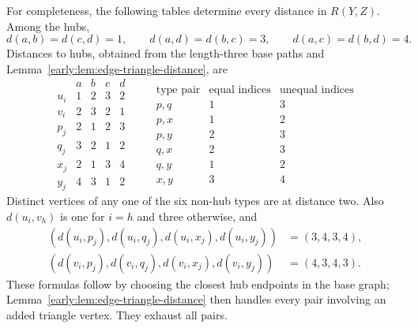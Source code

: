\documentclass[11pt,a4paper]{article}
\theoremstyle{definition}\newtheorem{definition}[theorem]{Definition}
\theoremstyle{remark}\newtheorem{remark}[theorem]{Remark}
\begin{document}
For completeness, the following tables determine every distance in
$R(Y,Z)$.  Among the hubs,
\[
 d(a,b)=d(c,d)=1,\qquad d(a,d)=d(b,c)=3,\qquad
 d(a,c)=d(b,d)=4.
\]
Distances to hubs, obtained from the length-three base paths and
Lemma~\ref{early:lem:edge-triangle-distance}, are
\[
\begin{array}{c|rrrr}
 &a&b&c&d\\\hline
 u_i&1&2&3&2\\
 v_i&2&3&2&1\\
 p_j&2&1&2&3\\
 q_j&3&2&1&2\\
 x_j&2&1&3&4\\
 y_j&4&3&1&2
\end{array}
\qquad
\begin{array}{c|cc}
 \text{type pair}&\text{equal indices}&\text{unequal indices}\\\hline
 p,q&1&3\\
 p,x&1&2\\
 p,y&2&3\\
 q,x&2&3\\
 q,y&1&2\\
 x,y&3&4
\end{array}
\]
Distinct vertices of any one of the six non-hub types are at distance
two.  Also $d(u_i,v_h)$ is one for $i=h$ and three otherwise, and
\begin{align*}
 (d(u_i,p_j),d(u_i,q_j),d(u_i,x_j),d(u_i,y_j))&=(3,4,3,4),\\
 (d(v_i,p_j),d(v_i,q_j),d(v_i,x_j),d(v_i,y_j))&=(4,3,4,3).
\end{align*}
These formulas follow by choosing the closest hub endpoints in the
base graph; Lemma~\ref{early:lem:edge-triangle-distance} then handles
every pair involving an added triangle vertex.  They exhaust all pairs.
\end{document}
